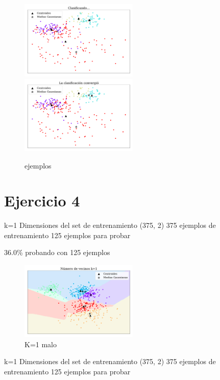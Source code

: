     \begin{figure}[H]
        \centering
        \includegraphics[width=0.5\textwidth]{ejer_2_clasificando.pdf}
        \includegraphics[width=0.5\textwidth]{ejer_2_no_converge.pdf}
        \caption{ejemplos}
        \label{fig:ejer2_no_converge}
    \end{figure}

    \section*{Ejercicio 4}



k=1
Dimensiones del set de entrenamiento  (375, 2)
375 ejemplos de entrenamiento
125 ejemplos para probar

36.0\% probando con 125 ejemplos

\begin{figure}[H]
    \centering
    \includegraphics[width=0.5\textwidth]{ejer_4_K-1_no_coverge.pdf}
    \caption{K=1 malo}
    \label{fig:ejer4_k_1_malo}
\end{figure} 

k=1
Dimensiones del set de entrenamiento  (375, 2)
375 ejemplos de entrenamiento
125 ejemplos para probar

